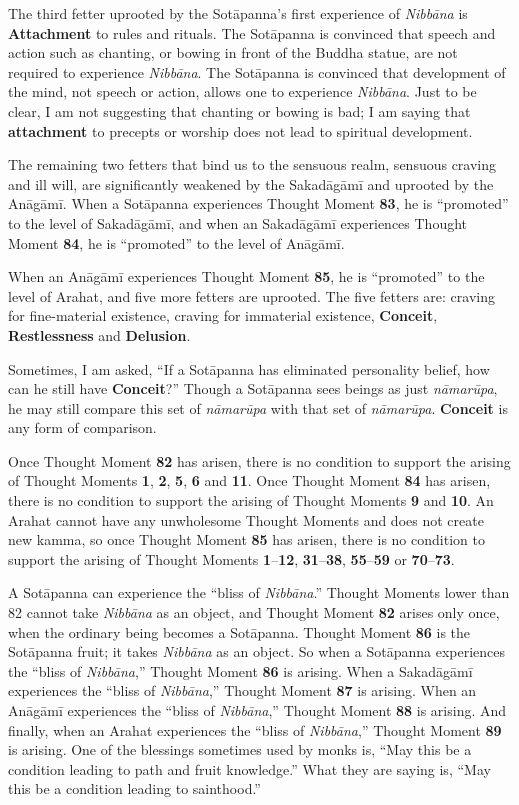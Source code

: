 The third fetter uprooted by the Sotāpanna’s first experience of \textit{Nibbāna} is \textbf{Attachment} to rules and rituals. The Sotāpanna is convinced that speech and action such as chanting, or bowing in front of the Buddha statue, are not required to experience \textit{Nibbāna}. The Sotāpanna is convinced that development of the mind, not speech or action, allows one to experience \textit{Nibbāna}. Just to be clear, I am not suggesting that chanting or bowing is bad; I am saying that \textbf{attachment} to precepts or worship does not lead to spiritual development.

The remaining two fetters that bind us to the sensuous realm, sensuous craving and ill will, are significantly weakened by the Sakadāgāmī and uprooted by the Anāgāmī. When a Sotāpanna experiences Thought Moment \textbf{83}, he is “promoted” to the level of Sakadāgāmī, and when an Sakadāgāmī experiences Thought Moment \textbf{84}, he is “promoted” to the level of Anāgāmī.

When an Anāgāmī experiences Thought Moment \textbf{85}, he is “promoted” to the level of Arahat, and five more fetters are uprooted. The five fetters are: craving for fine-material existence, craving for immaterial existence, \textbf{Conceit}, \textbf{Restlessness} and \textbf{Delusion}.

Sometimes, I am asked, “If a Sotāpanna has eliminated personality belief, how can he still have \textbf{Conceit}?” Though a Sotāpanna sees beings as just \textit{nāmarūpa}, he may still compare this set of \textit{nāmarūpa} with that set of \textit{nāmarūpa}. \textbf{Conceit} is any form of comparison.

Once Thought Moment \textbf{82} has arisen, there is no condition to support the arising of Thought Moments \textbf{1}, \textbf{2}, \textbf{5}, \textbf{6} and \textbf{11}. Once Thought Moment \textbf{84} has arisen, there is no condition to support the arising of Thought Moments \textbf{9} and \textbf{10}. An Arahat cannot have any unwholesome Thought Moments and does not create new kamma, so once Thought Moment \textbf{85} has arisen, there is no condition to support the arising of Thought Moments \textbf{1}--\textbf{12}, \textbf{31}--\textbf{38}, \textbf{55}--\textbf{59} or \textbf{70}--\textbf{73}.

A Sotāpanna can experience the “bliss of \textit{Nibbāna}.” Thought Moments lower than 82 cannot take \textit{Nibbāna} as an object, and Thought Moment \textbf{82} arises only once, when the ordinary being becomes a Sotāpanna. Thought Moment \textbf{86} is the Sotāpanna fruit; it takes \textit{Nibbāna} as an object. So when a Sotāpanna experiences the “bliss of \textit{Nibbāna},” Thought Moment \textbf{86} is arising. When a Sakadāgāmī experiences the “bliss of \textit{Nibbāna},” Thought Moment \textbf{87} is arising. When an Anāgāmī experiences the “bliss of \textit{Nibbāna},” Thought Moment \textbf{88} is arising. And finally, when an Arahat experiences the “bliss of \textit{Nibbāna},” Thought Moment \textbf{89} is arising. One of the blessings sometimes used by monks is, “May this be a condition leading to path and fruit knowledge.” What they are saying is, “May this be a condition leading to sainthood.”

